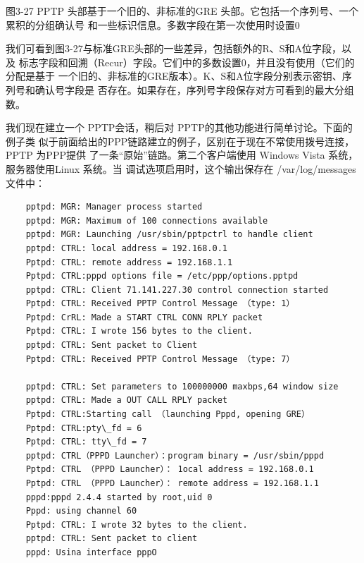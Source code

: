 图3-27 PPTP 头部基于一个旧的、非标准的GRE 头部。它包括一个序列号、一个累积的分组确认号
和一些标识信息。多数字段在第一次使用时设置0

我们可看到图3-27与标准GRE头部的一些差异，包括额外的R、S和A位字段，以及
标志字段和回溯（Recur）字段。它们中的多数设置0，并且没有使用（它们的分配是基于
一个旧的、非标准的GRE版本）。K、S和A位字段分别表示密钥、序列号和确认号字段是
否存在。如果存在，序列号字段保存对方可看到的最大分组数。

我们现在建立一个 PPTP会话，稍后对 PPTP的其他功能进行简单讨论。下面的例子类
似于前面给出的PPP链路建立的例子，区别在于现在不常使用拨号连接，PPTP 为PPP提供
了一条“原始”链路。第二个客户端使用 Windows Vista 系统，服务器使用Linux 系统。当
调试选项启用时，这个输出保存在 /var/log/messages 文件中：

\begin{verbatim}
    pptpd: MGR: Manager process started
    pptpd: MGR: Maximum of 100 connections available
    pptpd: MGR: Launching /usr/sbin/pptpctrl to handle client
    pptpd: CTRL: local address = 192.168.0.1
    Pptpd: CTRL: remote address = 192.168.1.1
    Pptpd: CTRL:pppd options file = /etc/ppp/options.pptpd
    pptpd: CTRL: Client 71.141.227.30 control connection started
    Pptpd: CTRL: Received PPTP Control Message （type: 1）
    Pptpd: CrRL: Made a START CTRL CONN RPLY packet
    Pptpd: CTRL: I wrote 156 bytes to the client.
    pptpd: CTRL: Sent packet to Client
    Pptpd: CTRL: Received PPTP Control Message （type: 7）

    pptpd: CTRL: Set parameters to 100000000 maxbps,64 window size
    pptpd: CTRL: Made a OUT CALL RPLY packet
    Pptpd: CTRL:Starting call （launching Pppd, opening GRE）
    Pptpd: CTRL:pty\_fd = 6
    Pptpd: CTRL: tty\_fd = 7
    pptpd: CTRL（PPPD Launcher）：program binary = /usr/sbin/pppd
    Pptpd: CTRL （PPPD Launcher）： 1ocal address = 192.168.0.1
    Pptpd: CTRL （PPPD Launcher）： remote address = 192.168.1.1
    pppd:pppd 2.4.4 started by root,uid 0
    Pppd: using channel 60
    Pptpd: CTRL: I wrote 32 bytes to the client.
    pptpd: CTRL: Sent packet to client
    pppd: Usina interface pppO


\end{verbatim}
